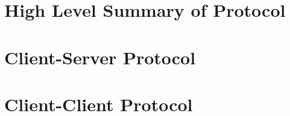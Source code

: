 \section{High Level Summary of Protocol}


\section{Client-Server Protocol}


\section{Client-Client Protocol}

